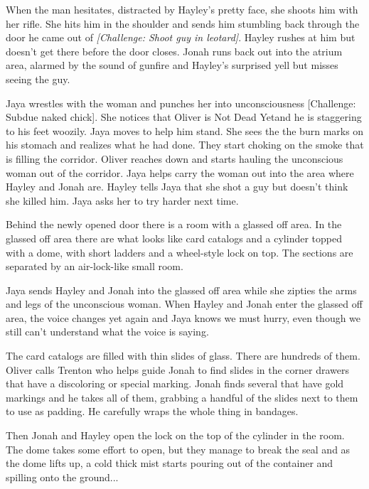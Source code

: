 When the man hesitates, distracted by Hayley's pretty face, she shoots him with her rifle.  She hits him in the shoulder and sends him stumbling back through the door he came out of \textit{{[}Challenge: Shoot guy in leotard{]}}.  Hayley rushes at him but doesn't get there before the door closes.  Jonah runs back out into the atrium area, alarmed by the sound of gunfire and Hayley's surprised yell but misses seeing the guy.



Jaya wrestles with the woman and punches her into unconsciousness {[}Challenge: Subdue naked chick{]}.  She notices that Oliver is Not Dead Yet\texttrademark and he is staggering to his feet woozily.  Jaya moves to help him stand.  She sees the the burn marks on his stomach and realizes what he had done.  They start choking on the smoke that is filling the corridor.  Oliver reaches down and starts hauling the unconscious woman out of the corridor.  Jaya helps carry the woman out into the area where Hayley and Jonah are.  Hayley tells Jaya that she shot a guy but doesn't think she killed him.  Jaya asks her to try harder next time.



Behind the newly opened door there is a room with a glassed off area.  In the glassed off area there are what looks like card catalogs and a cylinder topped with a dome, with short ladders and a wheel-style lock on top.  The sections are separated by an air-lock-like small room.



Jaya sends Hayley and Jonah into the glassed off area while she zipties the arms and legs of the unconscious woman.  When Hayley and Jonah enter the glassed off area, the voice changes yet again and Jaya knows we must hurry, even though we still can't understand what the voice is saying.



The card catalogs are filled with thin slides of glass.  There are hundreds of them.  Oliver calls Trenton who helps guide Jonah to find slides in the corner drawers that have a discoloring or special marking.  Jonah finds several that have gold markings and he takes all of them, grabbing a handful of the slides next to them to use as padding.  He carefully wraps the whole thing in bandages.



Then Jonah and Hayley open the lock on the top of the cylinder in the room.  The dome takes some effort to open, but they manage to break the seal and as the dome lifts up, a cold thick mist starts pouring out of the container and spilling onto the ground...





